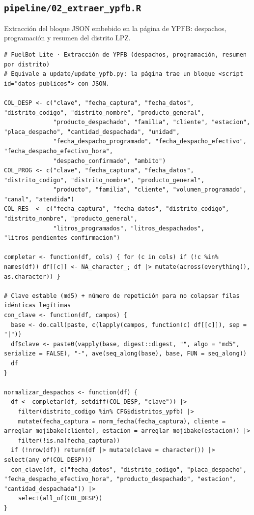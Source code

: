 \subsection{\texttt{pipeline/02\_extraer\_ypfb.R}}
Extracción del bloque JSON embebido en la página de YPFB: despachos, programación y resumen del distrito LPZ.
\begin{lstlisting}[style=anexoR]
# FuelBot Lite · Extracción de YPFB (despachos, programación, resumen por distrito)
# Equivale a update/update_ypfb.py: la página trae un bloque <script id="datos-publicos"> con JSON.

COL_DESP <- c("clave", "fecha_captura", "fecha_datos", "distrito_codigo", "distrito_nombre", "producto_general",
              "producto_despachado", "familia", "cliente", "estacion", "placa_despacho", "cantidad_despachada", "unidad",
              "fecha_despacho_programado", "fecha_despacho_efectivo", "fecha_despacho_efectivo_hora",
              "despacho_confirmado", "ambito")
COL_PROG <- c("clave", "fecha_captura", "fecha_datos", "distrito_codigo", "distrito_nombre", "producto_general",
              "producto", "familia", "cliente", "volumen_programado", "canal", "atendida")
COL_RES  <- c("fecha_captura", "fecha_datos", "distrito_codigo", "distrito_nombre", "producto_general",
              "litros_programados", "litros_despachados", "litros_pendientes_confirmacion")

completar <- function(df, cols) { for (c in cols) if (!c %in% names(df)) df[[c]] <- NA_character_; df |> mutate(across(everything(), as.character)) }

# Clave estable (md5) + número de repetición para no colapsar filas idénticas legítimas
con_clave <- function(df, campos) {
  base <- do.call(paste, c(lapply(campos, function(c) df[[c]]), sep = "|"))
  df$clave <- paste0(vapply(base, digest::digest, "", algo = "md5", serialize = FALSE), "-", ave(seq_along(base), base, FUN = seq_along))
  df
}

normalizar_despachos <- function(df) {
  df <- completar(df, setdiff(COL_DESP, "clave")) |>
    filter(distrito_codigo %in% CFG$distritos_ypfb) |>
    mutate(fecha_captura = norm_fecha(fecha_captura), cliente = arreglar_mojibake(cliente), estacion = arreglar_mojibake(estacion)) |>
    filter(!is.na(fecha_captura))
  if (!nrow(df)) return(df |> mutate(clave = character()) |> select(any_of(COL_DESP)))
  con_clave(df, c("fecha_datos", "distrito_codigo", "placa_despacho", "fecha_despacho_efectivo_hora", "producto_despachado", "estacion", "cantidad_despachada")) |>
    select(all_of(COL_DESP))
}


\end{lstlisting}
